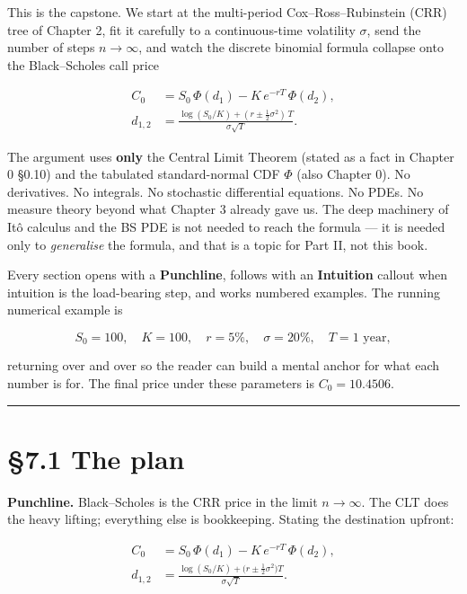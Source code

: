 \documentclass[
  10pt,
  twoside]{book}
\begin{document}
This is the capstone. We start at the multi-period Cox--Ross--Rubinstein
(CRR) tree of Chapter 2, fit it carefully to a continuous-time
volatility \(\sigma\), send the number of steps \(n \to \infty\), and
watch the discrete binomial formula collapse onto the Black--Scholes
call price

\[\boxed{\;\begin{aligned}
C_0 &= S_0\,\Phi(d_1) - K\,e^{-rT}\,\Phi(d_2), \\
d_{1,2} &= \frac{\log(S_0/K) + (r \pm \tfrac{1}{2}\sigma^2)\,T}{\sigma\sqrt{T}}.
\end{aligned}\;}\]

The argument uses \textbf{only} the Central Limit Theorem (stated as a
fact in Chapter 0 §0.10) and the tabulated standard-normal CDF \(\Phi\)
(also Chapter 0). No derivatives. No integrals. No stochastic
differential equations. No PDEs. No measure theory beyond what Chapter 3
already gave us. The deep machinery of Itô calculus and the BS PDE is
not needed to reach the formula --- it is needed only to
\emph{generalise} the formula, and that is a topic for Part II, not this
book.

Every section opens with a \textbf{Punchline}, follows with an
\textbf{Intuition} callout when intuition is the load-bearing step, and
works numbered examples. The running numerical example is

\[S_0 = 100, \quad K = 100, \quad r = 5\%, \quad \sigma = 20\%, \quad T = 1 \text{ year},\]

returning over and over so the reader can build a mental anchor for what
each number is for. The final price under these parameters is
\(C_0 = 10.4506\).

\begin{center}\rule{0.5\linewidth}{0.5pt}\end{center}

\section{§7.1 The plan}\label{the-plan}

\textbf{Punchline.} Black--Scholes is the CRR price in the limit
\(n \to \infty\). The CLT does the heavy lifting; everything else is
bookkeeping. Stating the destination upfront:

\[\begin{aligned}
C_0 &= S_0\,\Phi(d_1) - K\,e^{-rT}\,\Phi(d_2), \\
d_{1,2} &= \frac{\log(S_0/K) + \bigl(r \pm \tfrac{1}{2}\sigma^2\bigr)T}{\sigma\sqrt T}.
\end{aligned}\]
\end{document}
